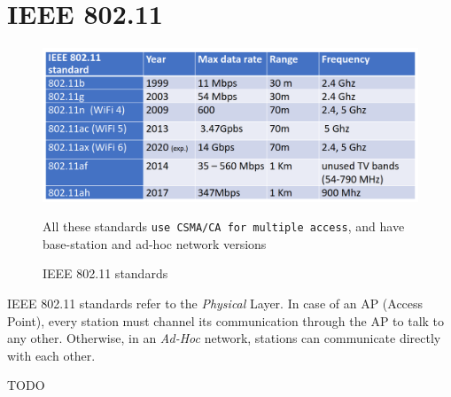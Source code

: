 \chapter{IEEE 802.11}

\begin{figure}[htbp]
   \centering
   \includegraphics{images/ieee_bgn.png}
   \caption{IEEE 802.11 standards}
   \label{fig:ieee_bgn}
   All these standards \texttt{use \texttt{CSMA/CA} for multiple access}, and have base-station and ad-hoc network versions
\end{figure}

IEEE 802.11 standards refer to the \textit{Physical} Layer.
In case of an AP (Access Point), every station must channel its communication through the AP to talk to any other. Otherwise, in an \textit{Ad-Hoc} network, stations can communicate directly with each other.

TODO

